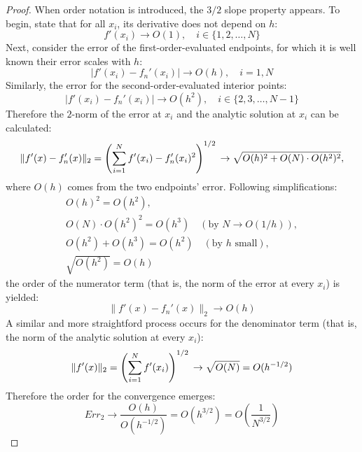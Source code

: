 \documentclass[12pt]{article}
\begin{document}
\begin{solution}
\begin{enumerate}[label=(\alph*)]
\begin{proof}
            When order notation is introduced, the $3/2$ slope property appears.
            To begin, state that for all $x_i$, its derivative does not depend on $h$:
            \[
                f'(x_i) \to O(1), \quad i \in \{1,2,\dots,N\}
            \]
            Next, consider the error of the first-order-evaluated endpoints, for which it is well known their error scales with $h$:
            \[
                \lvert f'(x_i) - f_n'(x_i) \lvert \to O(h), \quad i=1,N
            \]
            Similarly, the error for the second-order-evaluated interior points:
            \[
                \lvert f'(x_i) - f_n'(x_i) \lvert \to O(h^2), \quad i \in \{2,3,\dots,N-1\}
            \]
            Therefore the $2$-norm of the error at $x_i$ and the analytic solution at $x_i$ can be calculated:
            \[
                \lVert f'(x) - f_n'(x)\rVert_2 = \left( \sum_{i=1}^{N} f'(x_i) - f_n'(x_i)^2 \right)^{1/2} \\
                \to \sqrt{O(h)^2 + O(N) \cdot  O(h^2)^2},
            \]
            where $O(h)$ comes from the two endpoints' error. Following simplifications:
            \[  \begin{aligned}
                O(h)^2 = O(h^2),\\
                O(N) \cdot O(h^2)^2 = O(h^3) \quad (\text{by } N \to O(1/h)),\\
                O(h^2) + O(h^3) = O(h^2) \quad (\text{by }h\text{ small}),\\
                \sqrt{O(h^2)} = O(h)
            \end{aligned} \]
            the order of the numerator term (that is, the norm of the error at every $x_i$) is yielded:
            \[
                \lVert f'(x) - f_n'(x)\rVert_2 \to O(h)
            \]
            A similar and more straightford process occurs for the denominator term (that is, the norm of the analytic solution at every $x_i$):
            \[
                \lVert f'(x) \rVert_2 = \left( \sum_{i=1}^N f'(x_i) \right)^{1/2} \\
                \to \sqrt{O(N)} \\
                = O(h^{-1/2})
            \]
            Therefore the order for the convergence emerges:
            \[
                Err_2 \to \frac{O(h)}{O(h^{-1/2})} = O(h^{3/2}) = O(\frac{1}{N^{3/2}})
            \]
            \end{proof}
    \end{enumerate}
\end{solution}
\end{document}
